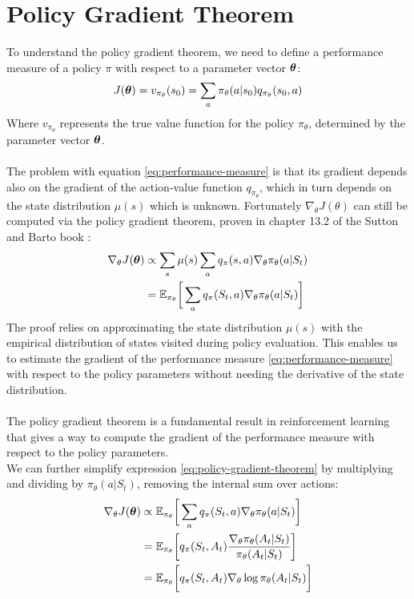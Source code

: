 \section{Policy Gradient Theorem}
To understand the policy gradient theorem, we need to define a performance measure of a policy $\pi$ with respect to a parameter vector $\boldsymbol{\theta}$:
\begin{equation}
    J(\boldsymbol{\theta}) = v_{\pi_{\theta}}(s_0) = \sum_a \pi_{\theta}(a|s_0) q_{\pi_{\theta}}(s_0, a)
    \label{eq:performance-measure}
\end{equation}
Where $v_{\pi_{\theta}}$ represents the true value function for the policy $\pi_{\theta}$, determined by the parameter vector $\boldsymbol{\theta}$.\\\\
The problem with equation \eqref{eq:performance-measure} is that its gradient depends also on the gradient of the action-value function $q_{\pi_{\theta}}$, which in turn depends on the state distribution $\mu(s)$ which is unknown. Fortunately $\nabla_{\theta} J(\theta)$ can still be computed via the policy gradient theorem, proven in chapter 13.2 of the Sutton and Barto book \cite{sutton-barto}:
\begin{equation}
    \begin{split}
        \nabla_\theta J(\boldsymbol{\theta}) & \propto \sum_s \mu(s) \sum_a q_{\pi}(s, a) \nabla_{\theta}\pi_{\theta}(a|S_t)\\
        & = \mathbb{E}_{\pi_{\theta}} \bigg[\sum_a q_{\pi}(S_t, a) \nabla_{\theta}\pi_{\theta}(a|S_t) \bigg]
    \end{split}
    \label{eq:policy-gradient-theorem}
\end{equation}
The proof relies on approximating the state distribution $\mu(s)$ with the empirical distribution of states visited during policy evaluation. This enables us to estimate the gradient of the performance measure \eqref{eq:performance-measure} with respect to the policy parameters without needing the derivative of the state distribution.\\\\
The policy gradient theorem is a fundamental result in reinforcement learning that gives a way to compute the gradient of the performance measure with respect to the policy parameters.\\
We can further simplify expression \eqref{eq:policy-gradient-theorem} by multiplying and dividing by $\pi_{\theta}(a|S_t)$, removing the internal sum over actions:
\begin{equation}
    \begin{split}
        \nabla_\theta J(\boldsymbol{\theta}) & \propto \mathbb{E}_{\pi_{\theta}} \bigg[\sum_a q_{\pi}(S_t, a) \nabla_{\theta}\pi_{\theta}(a|S_t) \bigg]\\
        & = \mathbb{E}_{\pi_{\theta}} \bigg[q_{\pi}(S_t, A_t) \frac{\nabla_{\theta} \pi_{\theta}(A_t|S_t)}{\pi_{\theta}(A_t|S_t)} \bigg]\\
        & = \mathbb{E}_{\pi_{\theta}} \bigg[q_{\pi}(S_t, A_t) \nabla_{\theta} \log \pi_{\theta}(A_t|S_t) \bigg]
    \end{split}
    \label{eq:single-action-policy-gradient}
\end{equation}
